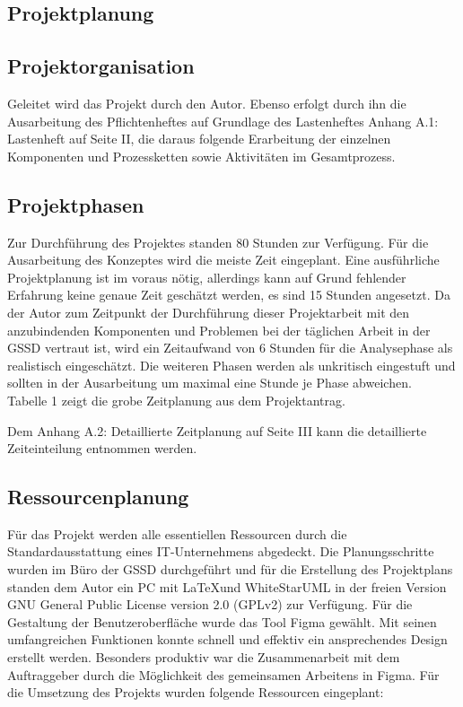 \begin{flushleft}
\section{Projektplanung}
\subsection{Projektorganisation}
Geleitet wird das Projekt durch den Autor. Ebenso erfolgt durch ihn die Ausarbeitung des Pflichtenheftes
auf Grundlage des Lastenheftes Anhang A.1: Lastenheft auf Seite II, die daraus folgende Erarbeitung der
einzelnen Komponenten und Prozessketten sowie Aktivitäten im Gesamtprozess.\\
\subsection{Projektphasen}

Zur Durchführung des Projektes standen 80 Stunden zur Verfügung. Für die Ausarbeitung des Konzeptes
wird die meiste Zeit eingeplant. Eine ausführliche Projektplanung ist im voraus nötig, allerdings kann auf
Grund fehlender Erfahrung keine genaue Zeit geschätzt werden, es sind 15 Stunden angesetzt. Da der
Autor zum Zeitpunkt der Durchführung dieser Projektarbeit mit den anzubindenden Komponenten und
Problemen bei der täglichen Arbeit in der \acs{GSSD} vertraut ist, wird ein Zeitaufwand von 6 Stunden für die
Analysephase als realistisch eingeschätzt. Die weiteren Phasen werden als unkritisch eingestuft und
sollten in der Ausarbeitung um maximal eine Stunde je Phase abweichen.\\





Tabelle 1 zeigt die grobe Zeitplanung aus dem Projektantrag.




Dem Anhang A.2: Detaillierte Zeitplanung auf Seite III kann die detaillierte Zeiteinteilung entnommen
werden.

\subsection{Ressourcenplanung}
Für das Projekt werden alle essentiellen Ressourcen durch die Standardausstattung eines IT-Unternehmens abgedeckt. Die Planungsschritte wurden im Büro der \acs{GSSD} durchgeführt und für die Erstellung des Projektplans standen dem Autor ein PC mit \LaTeX  und WhiteStarUML in der freien Version GNU General Public License version 2.0 (GPLv2) zur Verfügung.
Für die Gestaltung der Benutzeroberfläche wurde das Tool Figma gewählt. Mit seinen umfangreichen Funktionen konnte schnell und effektiv ein ansprechendes Design erstellt werden. Besonders produktiv war die Zusammenarbeit mit dem Auftraggeber durch die Möglichkeit des gemeinsamen Arbeitens in Figma.
Für die Umsetzung des Projekts wurden folgende Ressourcen eingeplant:


\end{flushleft}
